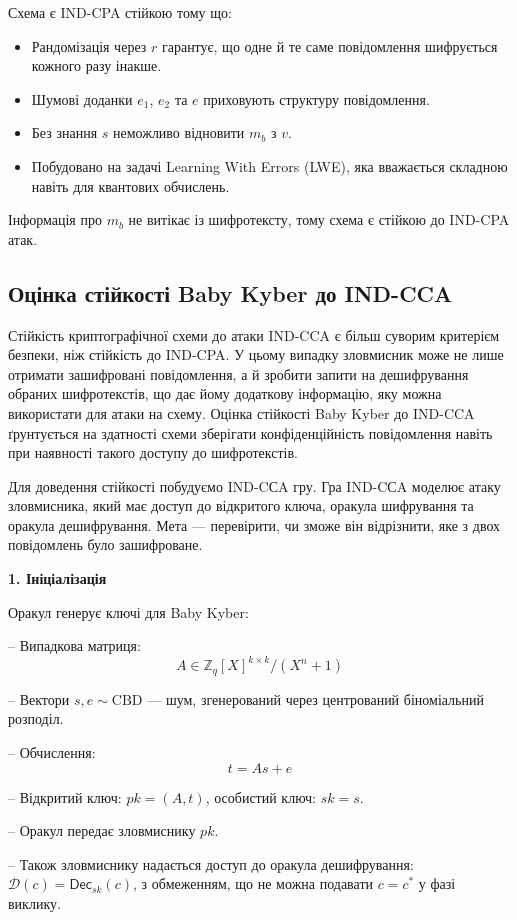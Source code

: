 Схема є IND-CPA стійкою тому що: 
\begin{itemize}
    \item Рандомізація через $r$ гарантує, що одне й те саме повідомлення шифрується кожного разу інакше.
    \item Шумові доданки $e_1$, $e_2$ та $e$ приховують структуру повідомлення.
    \item Без знання $s$ неможливо відновити $m_b$ з $v$.
    \item Побудовано на задачі Learning With Errors (LWE), яка вважається складною навіть для квантових обчислень.
\end{itemize}

Інформація про $m_b$ не витікає із шифротексту, тому схема є стійкою до IND-CPA атак.


\subsection*{Оцінка стійкості Baby Kyber до IND-CCA}

Стійкість криптографічної схеми до атаки IND-CCA є більш суворим критерієм безпеки, ніж стійкість до IND-CPA. У цьому випадку зловмисник може не лише отримати зашифровані повідомлення, а й зробити запити на дешифрування обраних шифротекстів, що дає йому додаткову інформацію, яку можна використати для атаки на схему. Оцінка стійкості Baby Kyber до IND-CCA ґрунтується на здатності схеми зберігати конфіденційність повідомлення навіть при наявності такого доступу до шифротекстів.

Для доведення стійкості побудуємо IND-CСA гру. Гра IND-CСA моделює атаку зловмисника, який має доступ до відкритого ключа, оракула шифрування та оракула дешифрування. Мета --- перевірити, чи зможе він відрізнити, яке з двох повідомлень було зашифроване.

\textbf{1. Ініціалізація}

Оракул генерує ключі для Baby Kyber:

– Випадкова матриця:  
\[
A \in \mathbb{Z}_q[X]^{k \times k} / (X^n + 1)
\]

– Вектори $s, e \sim \text{CBD}$ — шум, згенерований через центрований біноміальний розподіл.

– Обчислення:
\[
t = As + e
\]

– Відкритий ключ: $pk = (A, t)$, особистий ключ: $sk = s$.

– Оракул передає зловмиснику $pk$.

– Також зловмиснику надається доступ до оракула дешифрування: $\mathcal{D}(c) = \mathsf{Dec}_{sk}(c)$, з обмеженням, що не можна подавати $c = c^*$ у фазі виклику.


